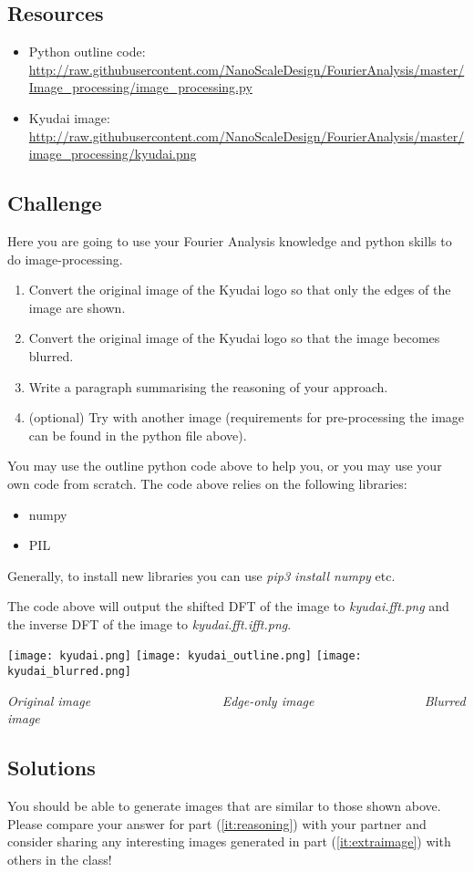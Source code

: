 \subsection*{Resources}
\begin{itemize}
    \item Python outline code: \url{http://raw.githubusercontent.com/NanoScaleDesign/FourierAnalysis/master/Image_processing/image_processing.py}
    \item Kyudai image: \url{http://raw.githubusercontent.com/NanoScaleDesign/FourierAnalysis/master/image_processing/kyudai.png}
\end{itemize}

\subsection*{Challenge}
Here you are going to use your Fourier Analysis knowledge and python skills to do image-processing.

\begin{enumerate}
    \item Convert the original image of the Kyudai logo so that only the edges of the image are shown.
    \item Convert the original image of the Kyudai logo so that the image becomes blurred.
    \item \label{it:reasoning} Write a paragraph summarising the reasoning of your approach.
    \item \label{it:extraimage} (optional) Try with another image (requirements for pre-processing the image can be found in the python file above).
\end{enumerate}

You may use the outline python code above to help you, or you may use your own code from scratch. The code above relies on the following libraries:
\begin{itemize}
    \item numpy
    \item PIL
\end{itemize}

Generally, to install new libraries you can use \emph{pip3 install numpy} etc.

The code above will output the shifted DFT of the image to \emph{kyudai.fft.png} and the inverse DFT of the image to \emph{kyudai.fft.ifft.png}.

\texttt{[image: kyudai.png]}
\texttt{[image: kyudai\_outline.png]}
\texttt{[image: kyudai\_blurred.png]}

\emph{Original image} ~ ~ ~ ~ ~ ~ ~ ~ ~ ~ ~ ~
\emph{Edge-only image} ~ ~ ~ ~ ~ ~ ~ ~ ~ ~
\emph{Blurred image}

\subsection*{Solutions}
You should be able to generate images that are similar to those shown above. Please compare your answer for part (\ref{it:reasoning}) with your partner and consider sharing any interesting images generated in part (\ref{it:extraimage}) with others in the class!
